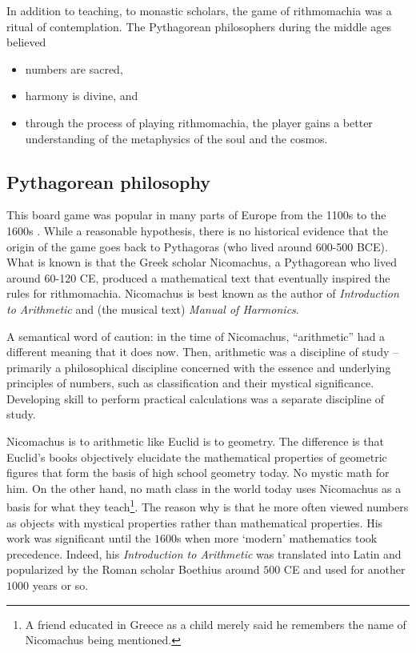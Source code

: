 \documentclass[14pt]{extarticle}
\begin{document}
In addition to teaching, to monastic scholars, the game of
rithmomachia was a ritual of contemplation. The Pythagorean
philosophers during the middle ages believed
\begin{itemize}
\item
numbers are sacred,
\item
harmony is divine, and
\item
through the process of playing rithmomachia, the player
gains a better understanding of the metaphysics of the soul
and the cosmos.
\end{itemize}

\subsection{Pythagorean philosophy}

This board game was popular in many parts of Europe from the 1100s
to the 1600s \cite{Mo01}.
While a reasonable hypothesis, there is no historical
evidence that the origin of the game goes back to
Pythagoras (who lived around 600-500 BCE). What is
known is that the Greek scholar Nicomachus, a Pythagorean who
lived around 60-120 CE, produced a mathematical text that
eventually inspired the rules for rithmomachia. Nicomachus is best known as
the author of {\it Introduction to Arithmetic} and (the musical text)
{\it Manual of Harmonics}.

A semantical word of caution: in the time of Nicomachus,
``arithmetic'' had a different meaning that it does now.
Then, arithmetic was a discipline of study
-- primarily a philosophical discipline concerned with
the essence and underlying principles of numbers,
such as classification and their mystical significance.
Developing skill to perform practical calculations was a separate
discipline of study.

Nicomachus is to arithmetic like Euclid is to geometry.
The difference is that Euclid's books objectively elucidate the
mathematical properties of geometric figures that
form the basis of high school geometry today. No mystic
math for him. On the other hand, no math class in the world
today uses Nicomachus as a basis for what they
teach\footnote{A friend educated in Greece as a child merely
  said he remembers the name of Nicomachus being mentioned.}. The reason
why is that he more often viewed numbers as objects with mystical
properties rather than mathematical properties. His work was
significant until the $1600$s when more `modern' mathematics
took precedence. Indeed, his {\it Introduction to Arithmetic} was
translated into Latin and popularized by the Roman scholar Boethius
around $500$ CE and used for another $1000$ years or so.
\end{document}
